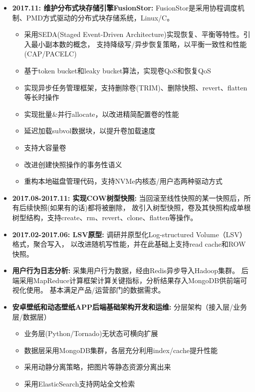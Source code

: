 
  \begin{itemize}[leftmargin=*]
      \item \textbf{2017.11: 维护分布式块存储引擎FusionStor:} FusionStor是采用协程调度机制、PMD方式驱动的分布式块存储系统，Linux/C。
          {\small
          \begin{itemize}
              \item 采用SEDA(Staged Event-Driven Architecture)实现恢复、平衡等特性。引入最小副本数的概念，
                  支持降级写/异步恢复策略，以平衡一致性和性能(CAP/PACELC)
              \item 基于token bucket和leaky bucket算法，实现卷QoS和恢复QoS
              \item 实现异步任务管理框架，支持删除卷(TRIM)、删除快照、revert、flatten等长时操作
              \item 实现批量\&并行allocate，以改进精简配置卷的性能
              \item 延迟加载subvol数据块，以提升卷加载速度
              \item 支持大容量卷
              \item 改进创建快照操作的事务性语义
              \item 重构本地磁盘管理代码，支持NVMe内核态/用户态两种驱动方式
          \end{itemize}
          }

      \item \textbf{2017.08-2017.11: 实现COW树型快照:} 当回滚至线性快照的某一快照后，所有后续快照(如果有的话)都将被删除，
          故引入树型快照，卷及其快照构成单根树型结构，支持create、rm、revert、clone、flatten等操作。

      \item \textbf{2017.02-2017.06: LSV原型:} 调研并原型化Log-structured Volume（LSV）格式，聚合写入，
          以改进随机写性能，并在此基础上支持read cache和ROW快照。

      \item \textbf{用户行为日志分析:} 采集用户行为数据，经由Redis异步导入Hadoop集群。
          后端采用MapReduce计算框架计算关键指标，分析结果存入MongoDB供前端可视化使用。
          基本满足产品/运营部门的数据需求。

      \item \textbf{安卓壁纸和动态壁纸APP后端基础架构开发和运维:} 分层架构（接入层/业务层/数据层）
          {\small
          \begin{itemize}
              \item 业务层(Python/Tornado)无状态可横向扩展
              \item 数据层采用MongoDB集群，各层充分利用index/cache提升性能
              \item 采用动静分离策略，把图片等静态资源分离出来
              \item 采用ElasticSearch支持网站全文检索
          \end{itemize}
          }


\end{itemize}
